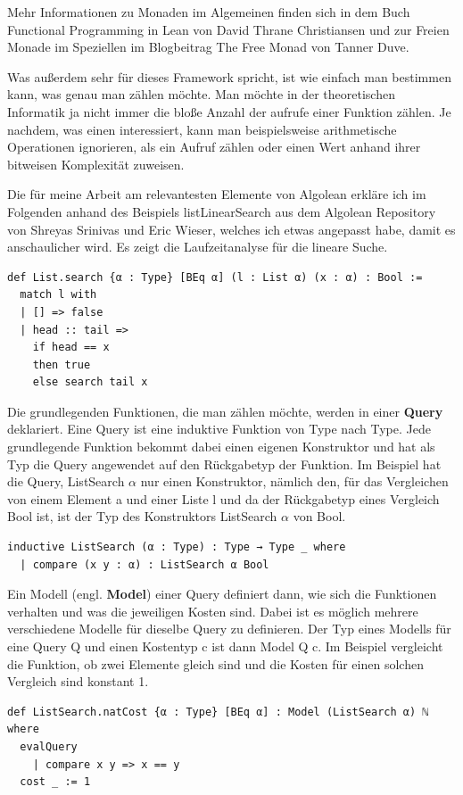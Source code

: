 Mehr Informationen zu Monaden im Algemeinen finden sich in dem Buch Functional Programming in Lean\cite{functional_programming_in_lean} von David Thrane Christiansen
und zur Freien Monade im Speziellen im Blogbeitrag The Free Monad\cite{the_free_monad} von Tanner Duve.

Was außerdem sehr für dieses Framework spricht, ist wie einfach man bestimmen kann, was genau man zählen möchte.
Man möchte in der theoretischen Informatik ja nicht immer die bloße Anzahl der aufrufe einer Funktion zählen.
Je nachdem, was einen interessiert, kann man beispielsweise arithmetische Operationen ignorieren, als ein Aufruf zählen oder einen Wert anhand ihrer bitweisen Komplexität zuweisen.

Die für meine Arbeit am relevantesten Elemente von Algolean erkläre ich im Folgenden anhand des Beispiels listLinearSearch aus dem Algolean Repository von Shreyas Srinivas und Eric Wieser,
welches ich etwas angepasst habe, damit es anschaulicher wird.
Es zeigt die Laufzeitanalyse für die lineare Suche.
\newpage
\begin{lstlisting}
def List.search {α : Type} [BEq α] (l : List α) (x : α) : Bool :=
  match l with
  | [] => false
  | head :: tail =>
    if head == x
    then true
    else search tail x
\end{lstlisting}

Die grundlegenden Funktionen, die man zählen möchte, werden in einer \textbf{Query} deklariert.
Eine Query ist eine induktive Funktion von Type nach Type.
Jede grundlegende Funktion bekommt dabei einen eigenen Konstruktor und hat als Typ die Query angewendet auf den Rückgabetyp der Funktion.
Im Beispiel hat die Query, ListSearch $\alpha$ nur einen Konstruktor, nämlich den, für das Vergleichen von einem Element a und einer Liste l und da der Rückgabetyp eines Vergleich Bool ist, ist der Typ des Konstruktors ListSearch $\alpha$ von Bool.
\begin{lstlisting}
inductive ListSearch (α : Type) : Type → Type _ where
  | compare (x y : α) : ListSearch α Bool
\end{lstlisting}

Ein Modell (engl. \textbf{Model}) einer Query definiert dann, wie sich die Funktionen verhalten und was die jeweiligen Kosten sind.
Dabei ist es möglich mehrere verschiedene Modelle für dieselbe Query zu definieren.
Der Typ eines Modells für eine Query Q und einen Kostentyp c ist dann Model Q c.
Im Beispiel vergleicht die Funktion, ob zwei Elemente gleich sind und die Kosten für einen solchen Vergleich sind konstant 1.
\begin{lstlisting}
def ListSearch.natCost {α : Type} [BEq α] : Model (ListSearch α) ℕ where
  evalQuery
    | compare x y => x == y
  cost _ := 1
\end{lstlisting}

